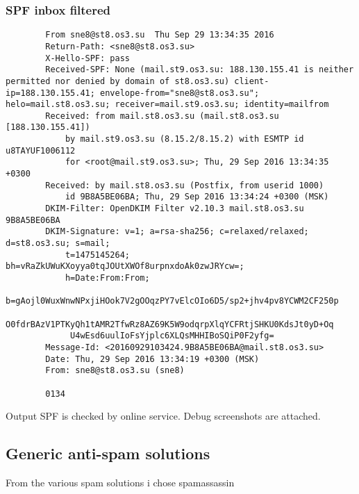 \documentclass[10pt]{article}
\begin{document}
        \subsubsection*{SPF inbox filtered}
        \begin{verbatim}
        From sne8@st8.os3.su  Thu Sep 29 13:34:35 2016
        Return-Path: <sne8@st8.os3.su>
        X-Hello-SPF: pass
        Received-SPF: None (mail.st9.os3.su: 188.130.155.41 is neither permitted nor denied by domain of st8.os3.su) client-ip=188.130.155.41; envelope-from="sne8@st8.os3.su"; helo=mail.st8.os3.su; receiver=mail.st9.os3.su; identity=mailfrom
        Received: from mail.st8.os3.su (mail.st8.os3.su [188.130.155.41])
            by mail.st9.os3.su (8.15.2/8.15.2) with ESMTP id u8TAYUF1006112
            for <root@mail.st9.os3.su>; Thu, 29 Sep 2016 13:34:35 +0300
        Received: by mail.st8.os3.su (Postfix, from userid 1000)
            id 9B8A5BE06BA; Thu, 29 Sep 2016 13:34:24 +0300 (MSK)
        DKIM-Filter: OpenDKIM Filter v2.10.3 mail.st8.os3.su 9B8A5BE06BA
        DKIM-Signature: v=1; a=rsa-sha256; c=relaxed/relaxed; d=st8.os3.su; s=mail;
            t=1475145264; bh=vRaZkUWuKXoyya0tqJOUtXWOf8urpnxdoAk0zwJRYcw=;
            h=Date:From:From;
            b=gAojl0WuxWnwNPxjiHOok7V2gOOqzPY7vElcOIo6D5/sp2+jhv4pv8YCWM2CF250p
             O0fdrBAzV1PTKyQh1tAMR2TfwRz8AZ69K5W9odqrpXlqYCFRtjSHKU0KdsJt0yD+Oq
             U4wEsd6uulIoFsYjplc6XLQsMHHIBoSQiP0F2yfg=
        Message-Id: <20160929103424.9B8A5BE06BA@mail.st8.os3.su>
        Date: Thu, 29 Sep 2016 13:34:19 +0300 (MSK)
        From: sne8@st8.os3.su (sne8)

        0134
        \end{verbatim}

        Output SPF is checked by online service. Debug screenshots are attached.

    \subsection{Generic anti-spam solutions}
    From the various spam solutions i chose spamassassin
\end{document}
